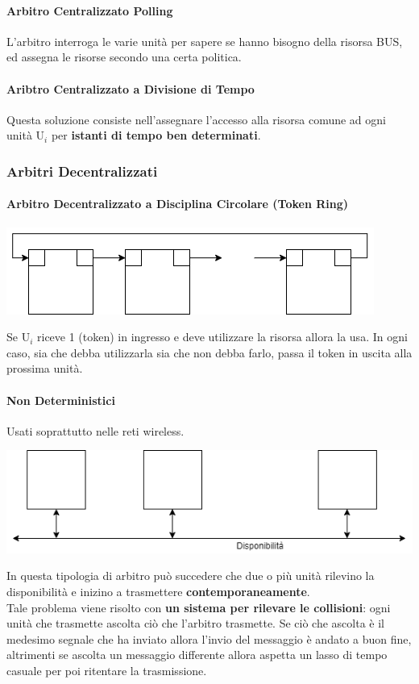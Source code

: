 \documentclass[10pt]{report}
\begin{document}
\paragraph{Arbitro Centralizzato Polling} L'arbitro interroga le varie unità per sapere se hanno bisogno della risorsa BUS, ed assegna le risorse secondo una certa politica.
\paragraph{Aribtro Centralizzato a Divisione di Tempo} Questa soluzione consiste nell'assegnare l'accesso alla risorsa comune ad ogni unità U$_i$ per \textbf{istanti di tempo ben determinati}.
\pagebreak
\subsubsection{Arbitri Decentralizzati}
\paragraph{Arbitro Decentralizzato a Disciplina Circolare (Token Ring)}
\begin{center}
\includegraphics[scale=0.7]{ardectoken.png}
\end{center}
Se U$_i$ riceve 1 (token) in ingresso e deve utilizzare la risorsa allora la usa. In ogni caso, sia che debba utilizzarla sia che non debba farlo, passa il token in uscita alla prossima unità.
\paragraph{Non Deterministici} Usati soprattutto nelle reti wireless.
\begin{center}
\includegraphics[scale=0.65]{arnondet.png}
\end{center}
In questa tipologia di arbitro può succedere che due o più unità rilevino la disponibilità e inizino a trasmettere \textbf{contemporaneamente}.\\
Tale problema viene risolto con \textbf{un sistema per rilevare le collisioni}: ogni unità che trasmette ascolta ciò che l'arbitro trasmette. Se ciò che ascolta è il medesimo segnale che ha inviato allora l'invio del messaggio è andato a buon fine, altrimenti se ascolta un messaggio differente allora aspetta un lasso di tempo casuale per poi ritentare la trasmissione.
\end{document}
